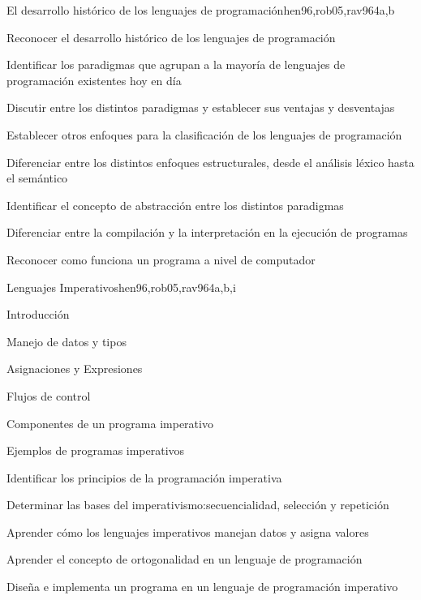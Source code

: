 \begin{syllabus}
\begin{unit}{El desarrollo histórico de los lenguajes de programación}{hen96,rob05,rav96}{4}{a,b}
   \begin{learningoutcomes}
      \item Reconocer el desarrollo histórico de los lenguajes de programación
      \item Identificar los paradigmas que agrupan a la mayoría de lenguajes de programación existentes hoy en día
      \item Discutir entre los distintos paradigmas y establecer sus ventajas y desventajas
      \item Establecer otros enfoques para la clasificación de los lenguajes de programación
      \item Diferenciar entre los distintos enfoques estructurales, desde el análisis léxico hasta el semántico
      \item Identificar el concepto de abstracción entre los distintos paradigmas
      \item Diferenciar entre la compilación y la interpretación en la ejecución de programas
      \item Reconocer como funciona un programa a nivel de computador
   \end{learningoutcomes}
\end{unit}

\begin{unit}{Lenguajes Imperativos}{hen96,rob05,rav96}{4}{a,b,i}
\begin{topics}
      \item Introducción
      \item Manejo de datos y tipos
      \item Asignaciones y Expresiones
      \item Flujos de control
      \item Componentes de un programa imperativo
      \item Ejemplos de programas imperativos
   \end{topics}

   \begin{learningoutcomes}
      \item Identificar los principios de la programación imperativa
      \item Determinar las bases del imperativismo:secuencialidad, selección y repetición
      \item Aprender cómo los lenguajes imperativos manejan datos y asigna valores
      \item Aprender el concepto de ortogonalidad en un lenguaje de programación
      \item Diseña e implementa un programa en un lenguaje de programación imperativo
   \end{learningoutcomes}
\end{unit}


\end{syllabus}
